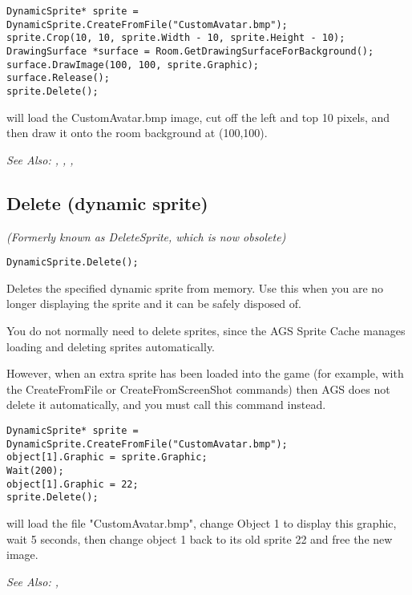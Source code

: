 \begin{verbatim}
DynamicSprite* sprite = DynamicSprite.CreateFromFile("CustomAvatar.bmp");
sprite.Crop(10, 10, sprite.Width - 10, sprite.Height - 10);
DrawingSurface *surface = Room.GetDrawingSurfaceForBackground();
surface.DrawImage(100, 100, sprite.Graphic);
surface.Release();
sprite.Delete();
\end{verbatim}
will load the CustomAvatar.bmp image, cut off the left and top 10 pixels, and then
draw it onto the room background at (100,100).

\it{See Also:} ,
,
,


\subsection{Delete (dynamic sprite)}\label{DynamicSprite.Delete}%

\it{(Formerly known as DeleteSprite, which is now obsolete)}

\begin{verbatim}
DynamicSprite.Delete();
\end{verbatim}
Deletes the specified dynamic sprite from memory. Use this when you are no longer displaying
the sprite and it can be safely disposed of.

You do not normally need to delete sprites, since the AGS Sprite Cache manages loading
and deleting sprites automatically.

However, when an extra sprite has been loaded into the game (for example, with the
CreateFromFile or CreateFromScreenShot commands) then AGS does not delete it automatically,
and you must call this command instead.

\begin{verbatim}
DynamicSprite* sprite = DynamicSprite.CreateFromFile("CustomAvatar.bmp");
object[1].Graphic = sprite.Graphic;
Wait(200);
object[1].Graphic = 22;
sprite.Delete();
\end{verbatim}
will load the file "CustomAvatar.bmp", change Object 1 to display this graphic, wait 5
seconds, then change object 1 back to its old sprite 22 and free the new image.

\it{See Also:} ,


